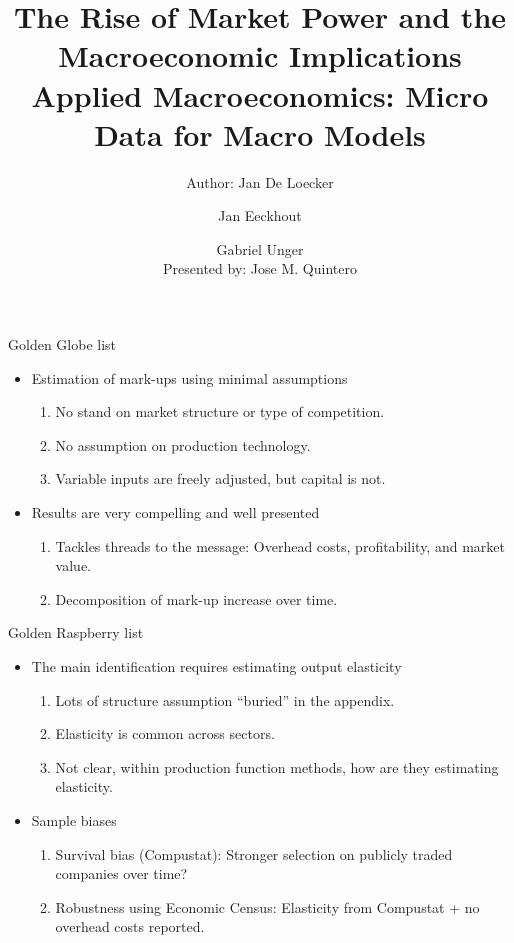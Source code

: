 \documentclass[usenames,dvipsnames,aspectratio=169]{beamer}
\title{The Rise of Market Power and the Macroeconomic Implications  \small{Applied Macroeconomics: Micro Data for Macro Models} }
\author{Author: Jan De Loecker \and Jan Eeckhout \and Gabriel Unger \\ Presented by: Jose M. Quintero}
\begin{document}
\begin{frame}
  \titlepage
\end{frame}

\begin{frame}{Golden Globe list}
\begin{itemize}[label=\textcolor{teal}{$\blacktriangleright$}]
    \item Estimation of mark-ups using minimal assumptions
    \begin{enumerate}[label=\textbf{\textcolor{teal}{\arabic*.}}]
        \item No stand on market structure or type of competition. 
        \item No assumption on production technology.
        \item Variable inputs are freely adjusted, but capital is not. 
    \end{enumerate}
    \vfill
    \item Results are very compelling and well presented
    \begin{enumerate}[label=\textbf{\textcolor{teal}{\arabic*.}}]
        \item Tackles threads to the message: Overhead costs, profitability, and market value. 
        \item Decomposition of mark-up increase over time. 
    \end{enumerate}
\end{itemize}
\end{frame}

\begin{frame}{Golden Raspberry list}
     \begin{itemize}[label=\textcolor{teal}{$\blacktriangleright$}]
         \item The main identification requires estimating output elasticity
         \begin{enumerate}[label=\textbf{\textcolor{teal}{\arabic*.}}]
             \item Lots of structure assumption ``buried'' in the appendix. 
             \item Elasticity is common across sectors. 
             \item Not clear, within production function methods, how are they estimating elasticity. 
         \end{enumerate}
         \vfill
         \item Sample biases
         \begin{enumerate}[label=\textbf{\textcolor{teal}{\arabic*.}}]
             \item Survival bias (Compustat): Stronger selection on publicly traded companies over time?
             \item Robustness using Economic Census: Elasticity from Compustat + no overhead costs reported. 
         \end{enumerate}
     \end{itemize}
\end{frame}
\end{document}
